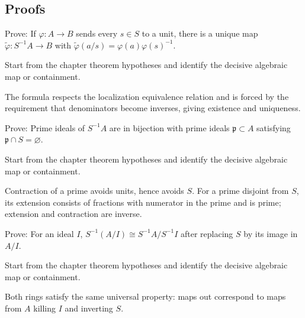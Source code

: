 \subsection*{Proofs}

\begin{exercise}\label{exr:v06-expand-06}
Prove: If $\varphi:A\to B$ sends every $s\in S$ to a unit, there is a unique map $\widetilde\varphi:S^{-1}A\to B$ with $\widetilde\varphi(a/s)=\varphi(a)\varphi(s)^{-1}$.
\end{exercise}
\begin{hint}
Start from the chapter theorem hypotheses and identify the decisive algebraic map or containment.
\end{hint}
\begin{solution}
The formula respects the localization equivalence relation and is forced by the requirement that denominators become inverses, giving existence and uniqueness.
\end{solution}

\begin{exercise}\label{exr:v06-expand-07}
Prove: Prime ideals of $S^{-1}A$ are in bijection with prime ideals $\mathfrak p\subset A$ satisfying $\mathfrak p\cap S=\varnothing$.
\end{exercise}
\begin{hint}
Start from the chapter theorem hypotheses and identify the decisive algebraic map or containment.
\end{hint}
\begin{solution}
Contraction of a prime avoids units, hence avoids $S$. For a prime disjoint from $S$, its extension consists of fractions with numerator in the prime and is prime; extension and contraction are inverse.
\end{solution}

\begin{exercise}\label{exr:v06-expand-08}
Prove: For an ideal $I$, $S^{-1}(A/I)\cong S^{-1}A/S^{-1}I$ after replacing $S$ by its image in $A/I$.
\end{exercise}
\begin{hint}
Start from the chapter theorem hypotheses and identify the decisive algebraic map or containment.
\end{hint}
\begin{solution}
Both rings satisfy the same universal property: maps out correspond to maps from $A$ killing $I$ and inverting $S$.
\end{solution}

